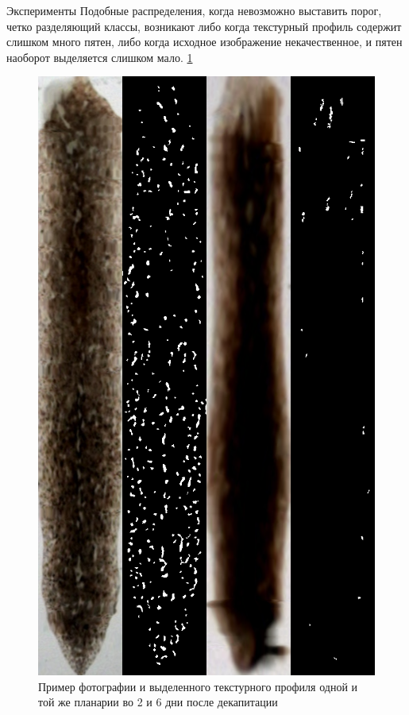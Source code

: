 \documentclass{article}
\begin{document}
\begin{section}{Эксперименты}
Подобные распределения, когда невозможно выставить порог, четко разделяющий классы, возникают либо когда текстурный профиль содержит слишком много пятен, либо когда исходное изображение некачественное, и пятен наоборот выделяется слишком мало. \ref{fig8}

\begin{figure}[H!]
\centering
\includegraphics[scale=0.3]{lessmore.png}
\caption{Пример фотографии и выделенного текстурного профиля одной и той же планарии во 2 и 6 дни после декапитации}
\label{fig8}
\end{figure}

\end{section}



\end{document}
